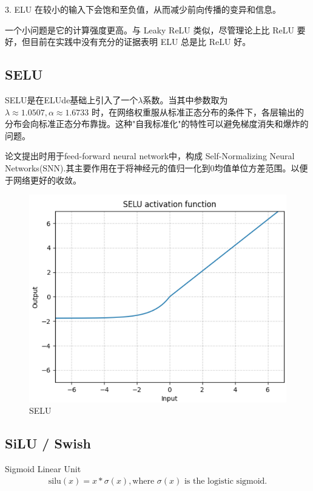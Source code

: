 \documentclass{article}
\begin{document}
3. ELU 在较小的输入下会饱和至负值，从而减少前向传播的变异和信息。

一个小问题是它的计算强度更高。与 Leaky ReLU 类似，尽管理论上比 ReLU 要好，但目前在实践中没有充分的证据表明 ELU 总是比 ReLU 好。

\subsection{SELU}
SELU是在ELUde基础上引入了一个$\lambda$系数。当其中参数取为 $\lambda \approx 1.0507, \alpha \approx 1.6733$ 时，在网络权重服从标准正态分布的条件下，各层输出的分布会向标准正态分布靠拢。这种"自我标准化"的特性可以避免梯度消失和爆炸的问题。

论文提出时用于feed-forward neural network中，构成 Self-Normalizing Neural Networks(SNN).其主要作用在于将神经元的值归一化到0均值单位方差范围。以便于网络更好的收敛。

\begin{figure}[htp]
\centering
\includegraphics[scale=0.4]{images/activation/selu.png}
\caption{SELU}
\label{SELU}
\end{figure}

\subsection{SiLU / Swish}
Sigmoid Linear Unit
\begin{align}
\text{silu}(x) = x * \sigma(x), \text{where } \sigma(x) \text{ is the logistic sigmoid.}
\end{align}
\end{document}
